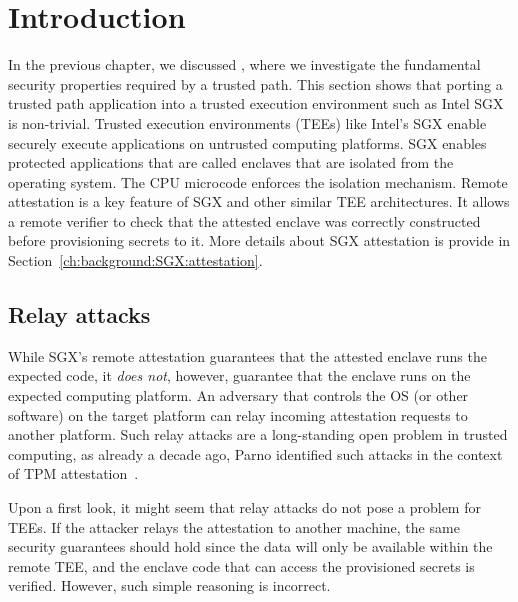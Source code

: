 \section{Introduction}
\label{sec:intro}


In the previous chapter, we discussed \protection, where we investigate the fundamental security properties required by a trusted path. This section shows that porting a trusted path application into a trusted execution environment such as Intel SGX is non-trivial. Trusted execution environments (TEEs) like Intel's SGX enable securely execute applications on untrusted computing platforms. SGX enables protected applications that are called enclaves that are isolated from the operating system. The CPU microcode enforces the isolation mechanism. Remote attestation is a key feature of SGX and other similar TEE architectures. It allows a remote verifier to check that the attested enclave was correctly constructed before provisioning secrets to it. More details about SGX attestation is provide in Section~\ref{ch:background:SGX:attestation}.


\subsection{Relay attacks}  While SGX's remote attestation guarantees that the attested enclave runs the expected code, it \emph{does not}, however,  guarantee that the enclave runs on the expected computing platform. An adversary that controls the OS (or other software) on the target platform can relay incoming attestation requests to another platform. Such relay attacks are a long-standing open problem in trusted computing, as already a decade ago, Parno identified such attacks in the context of TPM attestation~\cite{parno2008bootstrapping}.


Upon a first look, it might seem that relay attacks do not pose a problem for TEEs. If the attacker relays the attestation to another machine, the same security guarantees should hold since the data will only be available within the remote TEE, and the enclave code that can access the provisioned secrets is verified. However, such simple reasoning is incorrect. 

